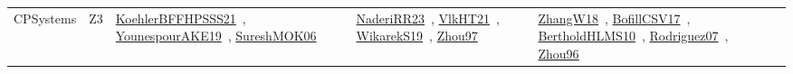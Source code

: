 {\begin{longtable}{lp{3cm}>{\raggedright\arraybackslash}p{6cm}>{\raggedright\arraybackslash}p{6cm}>{\raggedright\arraybackslash}p{8cm}}
CPSystems & Z3 & \href{works/KoehlerBFFHPSSS21.pdf}{KoehlerBFFHPSSS21}~\cite{KoehlerBFFHPSSS21}, \href{works/YounespourAKE19.pdf}{YounespourAKE19}~\cite{YounespourAKE19}, \href{works/SureshMOK06.pdf}{SureshMOK06}~\cite{SureshMOK06} & \href{works/NaderiRR23.pdf}{NaderiRR23}~\cite{NaderiRR23}, \href{works/VlkHT21.pdf}{VlkHT21}~\cite{VlkHT21}, \href{works/WikarekS19.pdf}{WikarekS19}~\cite{WikarekS19}, \href{works/Zhou97.pdf}{Zhou97}~\cite{Zhou97} & \href{works/ZhangW18.pdf}{ZhangW18}~\cite{ZhangW18}, \href{works/BofillCSV17.pdf}{BofillCSV17}~\cite{BofillCSV17}, \href{works/BertholdHLMS10.pdf}{BertholdHLMS10}~\cite{BertholdHLMS10}, \href{works/Rodriguez07.pdf}{Rodriguez07}~\cite{Rodriguez07}, \href{works/Zhou96.pdf}{Zhou96}~\cite{Zhou96}\\
\end{longtable}
}

